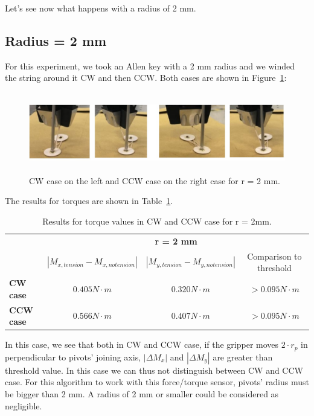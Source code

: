 Let's see now what happens with a radius of 2 mm.

\subsection{Radius = 2 mm}
For this experiment, we took an Allen key with a 2 mm radius and we winded the string around it CW and then CCW. Both cases are shown in Figure~\ref{fig:CWCCW3}:
\begin{figure}[h!]
	\centering
	\includegraphics[height=35mm]{chapters/figures/experiments/exp2_CWCCW3.jpg}
	\caption{CW case on the left and CCW case on the right case for r = 2 mm.}
	\label{fig:CWCCW3}
\end{figure}

The results for torques are shown in Table~\ref{tab:2mm}.
\begin{table}[htbp]
	\centering
	\begin{tabular}{|l|c|c|c|}
		\cmidrule{2-4}    \multicolumn{1}{r|}{} & \multicolumn{3}{c|}{\textbf{r = 2 mm}} \\
		\cmidrule{2-4}    \multicolumn{1}{r|}{} & \textbf{$|M_{x, tension} - M_{x, no tension}|$} & \textbf{$|M_{y, tension} - M_{y, no tension}|$} & Comparison to threshold \\
		\cmidrule{1-4}
		\textbf{CW case} & $0.405 N \cdot m$ & $0.320 N \cdot m$ & $> 0.095 N \cdot m$ \\
		\midrule
		\textbf{CCW case} & $0.566 N \cdot m$ & $0.407 N \cdot m$ & $> 0.095 N \cdot m$ \\
		\bottomrule
	\end{tabular}%
	\caption{Results for torque values in CW and CCW case for r = 2mm.}
	\label{tab:2mm}%
\end{table}%

In this case, we see that both in CW and CCW case, if the gripper moves $2 \cdot r_{p}$ in perpendicular to pivots' joining axis,  $|\Delta M_{x}|$ and $| \Delta M_{y}|$ are greater than threshold value. In this case we can thus not distinguish between CW and CCW case. For this algorithm to work with this force/torque sensor, pivots' radius must be bigger than 2 mm. A radius of 2 mm or smaller could be considered as negligible.

